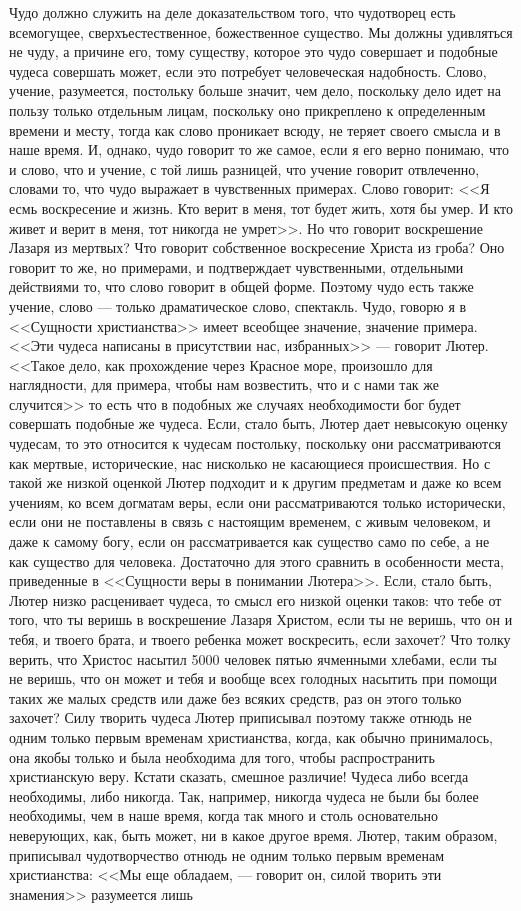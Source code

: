 \documentclass[12pt]{article}
\begin{document}
Чудо должно служить на деле доказательством того, что чудотворец есть всемогущее, сверхъестественное, божественное существо. Мы должны удивляться не чуду, а причине его, тому существу, которое это чудо совершает и подобные чудеса совершать может, если это потребует человеческая надобность. Слово, учение, разумеется, постольку больше значит, чем дело, поскольку дело идет на пользу только отдельным лицам, поскольку оно прикреплено к определенным времени и месту, тогда как слово проникает всюду, не теряет своего смысла и в наше время. И, однако, чудо говорит то же самое, если я его верно понимаю, что и слово, что и учение, с той лишь разницей, что учение говорит отвлеченно, словами то, что чудо выражает в чувственных примерах. Слово говорит: <<Я есмь воскресение и жизнь. Кто верит в меня, тот будет жить, хотя бы умер. И кто живет и верит в меня, тот никогда не умрет>>. Но что говорит воскрешение Лазаря из мертвых? Что говорит собственное воскресение Христа из гроба? Оно говорит то же, но примерами, и подтверждает чувственными, отдельными действиями то, что слово говорит в общей форме. Поэтому чудо есть также учение, слово --- только драматическое слово, спектакль. Чудо, говорю я в <<Сущности христианства>>  имеет всеобщее значение, значение примера. <<Эти чудеса написаны в присутствии нас, избранных>> --- говорит Лютер. <<Такое дело, как прохождение через Красное море, произошло для наглядности, для примера, чтобы нам возвестить, что и с нами так же случится>>  то есть что в подобных же случаях необходимости бог будет совершать подобные же чудеса. Если, стало быть, Лютер дает невысокую оценку чудесам, то это относится к чудесам постольку, поскольку они рассматриваются как мертвые, исторические, нас нисколько не касающиеся происшествия. Но с такой же низкой оценкой Лютер подходит и к другим предметам и даже ко всем учениям, ко всем догматам веры, если они рассматриваются только исторически, если они не поставлены в связь с настоящим временем, с живым человеком, и даже к самому богу, если он рассматривается как существо само по себе, а не как существо для человека. Достаточно для этого сравнить в особенности места, приведенные в <<Сущности веры в понимании Лютера>>. Если, стало быть, Лютер низко расценивает чудеса, то смысл его низкой оценки таков: что тебе от того, что ты веришь в воскрешение Лазаря Христом, если ты не веришь, что он и тебя, и твоего брата, и твоего ребенка может воскресить, если захочет? Что толку верить, что Христос насытил 5000 человек пятью ячменными хлебами, если ты не веришь, что он может и тебя и вообще всех голодных насытить при помощи таких же малых средств или даже без всяких средств, раз он этого только захочет? Силу творить чудеса Лютер приписывал поэтому также отнюдь не одним только первым временам христианства, когда, как обычно принималось, она якобы только и была необходима для того, чтобы распространить христианскую веру. Кстати сказать, смешное различие! Чудеса либо всегда необходимы, либо никогда. Так, например, никогда чудеса не были бы более необходимы, чем в наше время, когда так много и столь основательно неверующих, как, быть может, ни в какое другое время. Лютер, таким образом, приписывал чудотворчество отнюдь не одним только первым временам христианства: <<Мы еще обладаем, --- говорит он, силой творить эти знамения>>  разумеется лишь 
\end{document}
